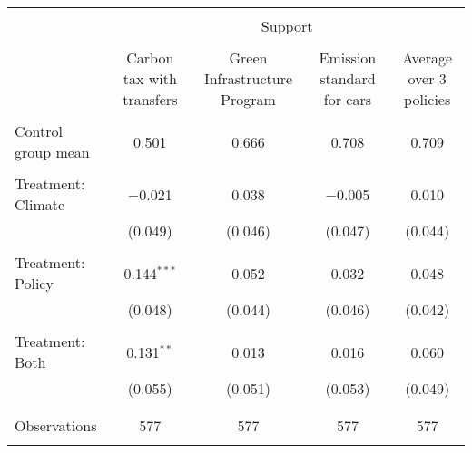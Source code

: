 
\begin{tabular}{@{\extracolsep{5pt}}lcccc} 
\\[-1.8ex]\hline 
\hline \\[-1.8ex] 
 & \multicolumn{4}{c}{Support} \\ 
\cline{2-5} 
\\[-1.8ex] & Carbon tax with transfers & Green Infrastructure Program & Emission standard for cars & Average over 3 policies \\ 
\hline \\[-1.8ex] 
 Control group mean & 0.501 & 0.666 & 0.708 & 0.709  \\ \hline \\[-1.8ex] Treatment: Climate & $-$0.021 & 0.038 & $-$0.005 & 0.010 \\ 
  & (0.049) & (0.046) & (0.047) & (0.044) \\ 
  & & & & \\ 
 Treatment: Policy & 0.144$^{***}$ & 0.052 & 0.032 & 0.048 \\ 
  & (0.048) & (0.044) & (0.046) & (0.042) \\ 
  & & & & \\ 
 Treatment: Both & 0.131$^{**}$ & 0.013 & 0.016 & 0.060 \\ 
  & (0.055) & (0.051) & (0.053) & (0.049) \\ 
  & & & & \\ 
\hline \\[-1.8ex] 

Observations & 577 & 577 & 577 & 577 \\ 
\hline 
\hline \\[-1.8ex] 
\end{tabular} 